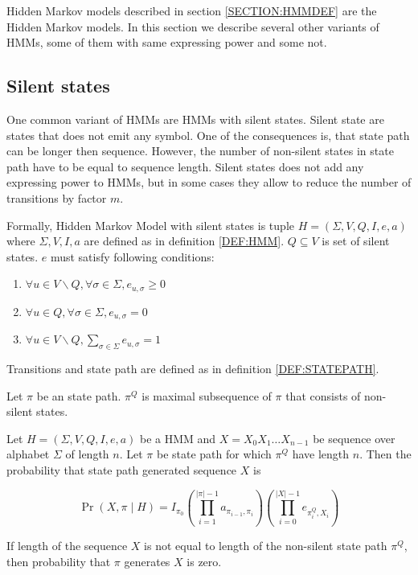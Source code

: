 Hidden Markov models described in section \ref{SECTION:HMMDEF} are the Hidden
Markov models. In this section we describe several other variants of HMMs, some
of them with same expressing power and some not.

\subsection{Silent states}

One common variant of HMMs are HMMs with silent states. Silent state are states
that does not emit any symbol. One of the consequences is, that state path can
be longer then sequence. However, the number of non-silent states in state path
have to be equal to sequence length. Silent states does not add any expressing
power to HMMs, but in some cases they allow to reduce the number of transitions
by factor $m$.

\begin{definition}
Formally, Hidden Markov Model with silent states is tuple $H=(\Sigma,V,Q,I,e,a)$
where $\Sigma,V,I,a$ are defined as in definition \ref{DEF:HMM}. $Q\subseteq V$ is set of
silent states. $e$ must satisfy following conditions:
\begin{enumerate}
\item $\forall u\in V\backslash Q,\forall \sigma\in\Sigma, e_{u,\sigma}\geq0$
\item $\forall u\in Q,\forall \sigma\in\Sigma, e_{u,\sigma}=0$
\item $\forall u\in V\backslash Q, \sum_{\sigma\in \Sigma}e_{u,\sigma}=1$
\end{enumerate}
\end{definition}

\begin{definition}
Transitions and state path are defined as in definition \ref{DEF:STATEPATH}. 

Let $\pi$ be an state path.  $\pi^Q$ is
maximal subsequence of $\pi$ that consists of non-silent states.
\end{definition}

\begin{definition}
Let $H=(\Sigma,V,Q,I,e,a)$ be a HMM and $X=X_0X_1\dots X_{n-1}$ be sequence over
alphabet $\Sigma$ of length $n$. Let $\pi$ be state path for which $\pi^Q$ have
length $n$. Then the probability that state path generated sequence $X$ is 

\[\Pr\left(X,\pi\mid H\right) =
I_{\pi_0}\left(\prod_{i=1}^{|\pi|-1}a_{\pi_{i-1},\pi_i}\right)\left(\prod_{i=0}^{|X|-1}e_{\pi^Q_i,X_i}\right)\]

If length of the sequence $X$ is not equal to length of the non-silent state
path $\pi^Q$, then
probability that $\pi$ generates $X$ is zero.
\end{definition}

